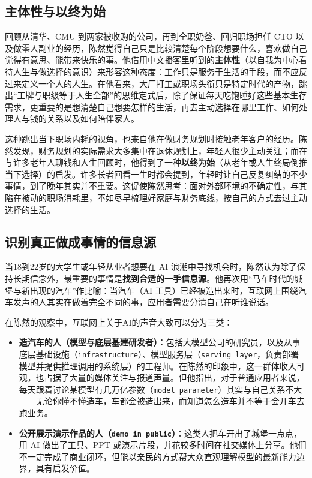 \documentclass[UTF8,a4paper,11pt,fontset=fandol]{ctexart}
\begin{document}
\subsection{主体性与以终为始}
回顾从清华、CMU 到两家被收购的公司，再到全职奶爸、回归职场担任 CTO 以及做零人副业的经历，陈然觉得自己只是比较清楚每个阶段想要什么，喜欢做自己觉得有意思、能带来快乐的事。他借用中文播客里听到的\textbf{主体性}（以自我为中心看待人生与做选择的意识）来形容这种态度：工作只是服务于生活的手段，而不应反过来定义一个人的人生。在他看来，大厂打工或职场头衔只是特定时代的产物，跳出“工牌与职级等于人生全部”的思维定式后，除了保证每天吃饱睡好这些基本生存需求，更重要的是想清楚自己想要怎样的生活，再去主动选择在哪里工作、如何处理人与钱的关系以及如何陪伴家人。

这种跳出当下职场内耗的视角，也来自他在做财务规划时接触老年客户的经历。陈然发现，财务规划的实际需求大多集中在退休规划上，年轻人很少主动关注；而在与许多老年人聊钱和人生回顾时，他得到了一种\textbf{以终为始}（从老年或人生终局倒推当下选择）的启发。许多长者回看一生时都会提到，年轻时让自己反复纠结的不少事情，到了晚年其实并不重要。这促使陈然思考：面对外部环境的不确定性，与其陷在被动的职场消耗里，不如尽早梳理好家庭与财务底线，按自己的方式去过主动选择的生活。

\subsection{识别真正做成事情的信息源}
当18到22岁的大学生或年轻从业者想要在 AI 浪潮中寻找机会时，陈然认为除了保持长期信念外，最重要的事情是\textbf{找到合适的一手信息源}。他再次用“马车时代的城堡与新出现的汽车”作比喻：当汽车（AI 工具）已经被造出来时，互联网上围绕汽车发声的人其实在做着完全不同的事，应用者需要分清自己在听谁说话。

在陈然的观察中，互联网上关于AI的声音大致可以分为三类：

\begin{itemize}
\item \textbf{造汽车的人（模型与底层基建研发者）}：包括大模型公司的研究员，以及从事底层基础设施（\texttt{infrastructure}）、模型服务层（\texttt{serving layer}，负责部署模型并提供推理调用的系统层）的工程师。在陈然的印象中，这一群体收入可观，也占据了大量的媒体关注与报道声量。但他指出，对于普通应用者来说，每天跟着讨论某模型有几万亿参数（\texttt{model parameter}）其实与自己关系不大——无论你懂不懂造车，车都会被造出来，而知道怎么造车并不等于会开车去跑业务。
\end{itemize}

\begin{itemize}
\item \textbf{公开展示演示作品的人（\texttt{demo in public}）}：这类人把车开出了城堡一点点，用 AI 做出了工具、PPT 或演示片段，并花较多时间在社交媒体上分享。他们不一定完成了商业闭环，但能以亲民的方式帮大众直观理解模型的最新能力边界，具有启发价值。
\end{itemize}
\end{document}
